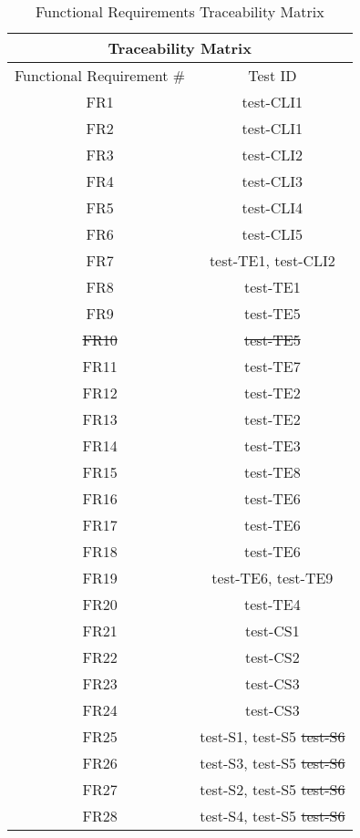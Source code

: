 \documentclass[12pt, titlepage]{article}
\begin{document}
\begin{table}[H]
    \centering
\begin{tabular}{|c|c|}
\hline
\multicolumn{2}{|c|}{Traceability Matrix} \\ \hline
Functional Requirement \# & Test ID \\ \hline
FR1 & test-CLI1 \\ \hline
FR2 & test-CLI1 \\ \hline
FR3 & test-CLI2 \\ \hline
FR4 & test-CLI3 \\ \hline
FR5 & test-CLI4 \\ \hline
FR6 & test-CLI5 \\ \hline
FR7 & test-TE1, {\color{red}test-CLI2} \\ \hline
FR8 & test-TE1 \\ \hline
FR9 & test-TE5 \\ \hline
\sout{FR10} & \sout{test-TE5} \\ \hline
FR11 & test-TE7 \\ \hline
FR12 & test-TE2 \\ \hline
FR13 & test-TE2 \\ \hline
FR14 & test-TE3 \\ \hline
FR15 & {\color{red}test-TE8} \\ \hline
FR16 & test-TE6 \\ \hline
FR17 & test-TE6 \\ \hline
FR18 & test-TE6 \\ \hline
FR19 & test-TE6, {\color{red}test-TE9} \\ \hline
FR20 & test-TE4 \\ \hline
FR21 & test-CS1 \\ \hline
FR22 & test-CS2 \\ \hline
FR23 & test-CS3 \\ \hline
FR24 & test-CS3 \\ \hline
FR25 & test-S1, test-S5 \sout{test-S6}\\ \hline
FR26 & test-S3, test-S5 \sout{test-S6}\\ \hline
FR27 & test-S2, test-S5 \sout{test-S6} \\ \hline
FR28 & test-S4, test-S5 \sout{test-S6}\\ \hline
\end{tabular}
    \caption{Functional Requirements Traceability Matrix}
    \label{tab:frtrace}
\end{table}
\end{document}
